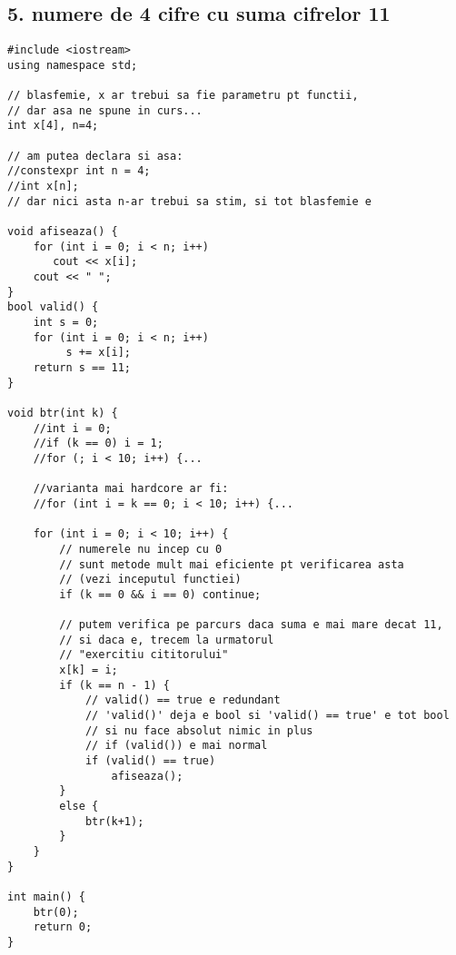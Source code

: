 \documentclass[11pt]{article}
\begin{document}
\subsection*{5. numere de 4 cifre cu suma cifrelor 11}
\label{sec:org1624535}
\begin{verbatim}
#include <iostream>
using namespace std;

// blasfemie, x ar trebui sa fie parametru pt functii,
// dar asa ne spune in curs...
int x[4], n=4;

// am putea declara si asa:
//constexpr int n = 4;
//int x[n];
// dar nici asta n-ar trebui sa stim, si tot blasfemie e

void afiseaza() {
    for (int i = 0; i < n; i++)
       cout << x[i];
    cout << " ";
}
bool valid() {
    int s = 0;
    for (int i = 0; i < n; i++)
         s += x[i];
    return s == 11;
}

void btr(int k) {
    //int i = 0;
    //if (k == 0) i = 1;
    //for (; i < 10; i++) {...

    //varianta mai hardcore ar fi:
    //for (int i = k == 0; i < 10; i++) {...

    for (int i = 0; i < 10; i++) {
        // numerele nu incep cu 0
        // sunt metode mult mai eficiente pt verificarea asta
        // (vezi inceputul functiei)
        if (k == 0 && i == 0) continue;

        // putem verifica pe parcurs daca suma e mai mare decat 11,
        // si daca e, trecem la urmatorul
        // "exercitiu cititorului"
        x[k] = i;
        if (k == n - 1) {
            // valid() == true e redundant
            // 'valid()' deja e bool si 'valid() == true' e tot bool
            // si nu face absolut nimic in plus
            // if (valid()) e mai normal
            if (valid() == true)
                afiseaza();
        }
        else {
            btr(k+1);
        }
    }  
}

int main() {
    btr(0);
    return 0;
}
\end{verbatim}
\end{document}
